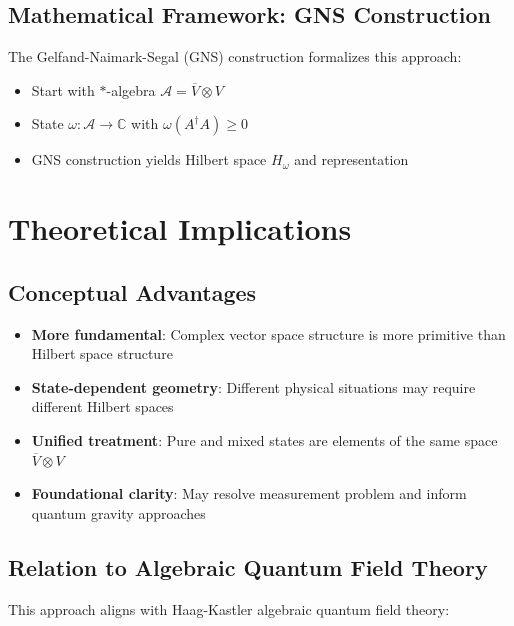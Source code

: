 \documentclass[aps,preprint]{revtex4}
\begin{document}
\subsection{Mathematical Framework: GNS Construction}

The Gelfand-Naimark-Segal (GNS) construction formalizes this approach:

\begin{itemize}
\item Start with $*$-algebra $\mathcal{A} = \overline{V} \otimes V$

\item State $\omega: \mathcal{A} \to \mathbb{C}$ with $\omega(A^\dagger A)
\geq 0$

\item GNS construction yields Hilbert space $H_\omega$ and representation
\end{itemize}

\section{Theoretical Implications}

\subsection{Conceptual Advantages}

\begin{itemize}
\item \textbf{More fundamental}: Complex vector space structure is more
primitive than Hilbert space structure

\item \textbf{State-dependent geometry}: Different physical situations may
require different Hilbert spaces

\item \textbf{Unified treatment}: Pure and mixed states are elements of the
same space $\overline{V} \otimes V$

\item \textbf{Foundational clarity}: May resolve measurement problem and
inform quantum gravity approaches
\end{itemize}

\subsection{Relation to Algebraic Quantum Field Theory}

This approach aligns with Haag-Kastler algebraic quantum field theory:
\end{document}
